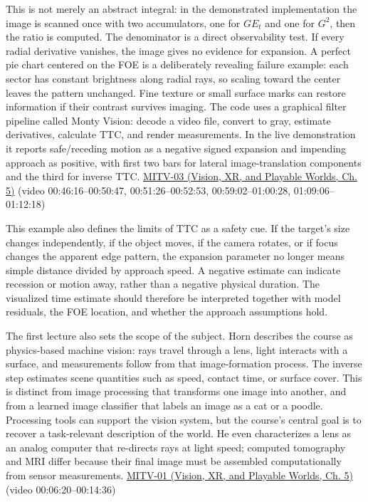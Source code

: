 This is not merely an abstract integral: in the demonstrated implementation the image is scanned once with two accumulators, one for \(GE_t\) and one for \(G^2\), then the ratio is computed. The denominator is a direct observability test. If every radial derivative vanishes, the image gives no evidence for expansion. A perfect pie chart centered on the FOE is a deliberately revealing failure example: each sector has constant brightness along radial rays, so scaling toward the center leaves the pattern unchanged. Fine texture or small surface marks can restore information if their contrast survives imaging. The code uses a graphical filter pipeline called Monty Vision: decode a video file, convert to gray, estimate derivatives, calculate TTC, and render measurements. In the live demonstration it reports safe/receding motion as a negative signed expansion and impending approach as positive, with first two bars for lateral image-translation components and the third for inverse TTC. \href{../07-Vision-XR-and-Playable-Worlds/main.pdf\#nameddest=04-visual-computing-ii-ch036-mitv-03---time-to-contact-focus-of-expansion-direct-motion-vision-methods-noise-gain}{MITV-03 (Vision, XR, and Playable Worlds, Ch. 5)} (video 00:46:16--00:50:47, 00:51:26--00:52:53, 00:59:02--01:00:28, 01:09:06--01:12:18)

This example also defines the limits of TTC as a safety cue. If the target's size changes independently, if the object moves, if the camera rotates, or if focus changes the apparent edge pattern, the expansion parameter no longer means simple distance divided by approach speed. A negative estimate can indicate recession or motion away, rather than a negative physical duration. The visualized time estimate should therefore be interpreted together with model residuals, the FOE location, and whether the approach assumptions hold.

The first lecture also sets the scope of the subject. Horn describes the course as physics-based machine vision: rays travel through a lens, light interacts with a surface, and measurements follow from that image-formation process. The inverse step estimates scene quantities such as speed, contact time, or surface cover. This is distinct from image processing that transforms one image into another, and from a learned image classifier that labels an image as a cat or a poodle. Processing tools can support the vision system, but the course's central goal is to recover a task-relevant description of the world. He even characterizes a lens as an analog computer that re-directs rays at light speed; computed tomography and MRI differ because their final image must be assembled computationally from sensor measurements. \href{../07-Vision-XR-and-Playable-Worlds/main.pdf\#nameddest=04-visual-computing-ii-ch036-mitv-01---introduction-to-machine-vision}{MITV-01 (Vision, XR, and Playable Worlds, Ch. 5)} (video 00:06:20--00:14:36)

